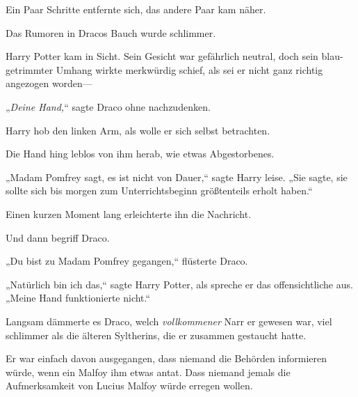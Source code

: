 Ein Paar Schritte entfernte sich, das andere Paar kam näher.

Das Rumoren in Dracos Bauch wurde schlimmer.

Harry Potter kam in Sicht. Sein Gesicht war gefährlich neutral, doch sein blau-getrimmter Umhang wirkte merkwürdig schief, als sei er nicht ganz richtig angezogen worden—

„\emph{Deine Hand,}“ sagte Draco ohne nachzudenken.

Harry hob den linken Arm, als wolle er sich selbst betrachten.

Die Hand hing leblos von ihm herab, wie etwas Abgestorbenes.

„Madam Pomfrey sagt, es ist nicht von Dauer,“ sagte Harry leise. „Sie sagte, sie sollte sich bis morgen zum Unterrichtsbeginn größtenteils erholt haben.“

Einen kurzen Moment lang erleichterte ihn die Nachricht.

Und dann begriff Draco.

„Du bist zu Madam Pomfrey gegangen,“ flüsterte Draco.

„Natürlich bin ich das,“ sagte Harry Potter, als spreche er das offensichtliche aus. „Meine Hand funktionierte nicht.“

Langsam dämmerte es Draco, welch \emph{vollkommener} Narr er gewesen war, viel schlimmer als die älteren Syltherins, die er zusammen gestaucht hatte.

Er war einfach davon ausgegangen, dass niemand die Behörden informieren würde, wenn ein Malfoy ihm etwas antat. Dass niemand jemals die Aufmerksamkeit von Lucius Malfoy würde erregen wollen.


